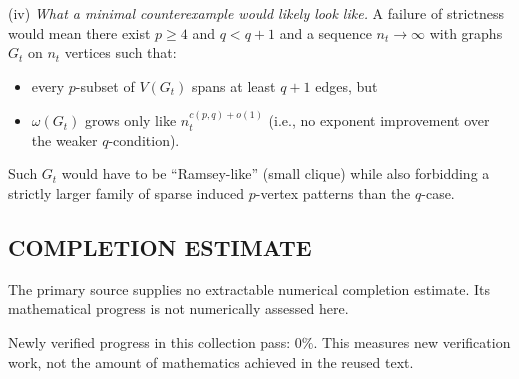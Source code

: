 \noindent(iv) \emph{What a minimal counterexample would likely look like.}
A failure of strictness would mean there exist $p\ge 4$ and $q<q+1$ and a sequence $n_t\to\infty$ with graphs $G_t$ on $n_t$ vertices such that:
\begin{itemize}
\item every $p$-subset of $V(G_t)$ spans at least $q+1$ edges, but
\item $\omega(G_t)$ grows only like $n_t^{c(p,q)+o(1)}$ (i.e., no exponent improvement over the weaker $q$-condition).
\end{itemize}
Such $G_t$ would have to be ``Ramsey-like'' (small clique) while also forbidding a strictly larger family of sparse induced $p$-vertex patterns than the $q$-case.




\subsection*{COMPLETION ESTIMATE}
The primary source supplies no extractable numerical completion estimate. Its mathematical progress is not numerically assessed here.

Newly verified progress in this collection pass: $0\%$. This measures new verification work, not the amount of mathematics achieved in the reused text.
